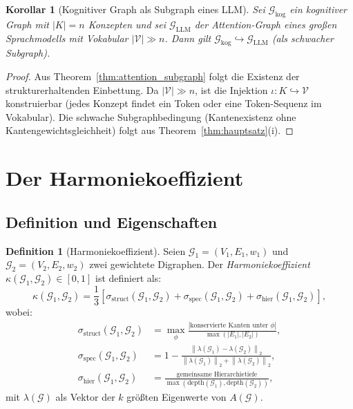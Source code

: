 ﻿\documentclass[12pt,a4paper]{article}
\theoremstyle{plain}
\newtheorem{korollar}[theorem]{Korollar}
\theoremstyle{definition}
\newtheorem{definition}[theorem]{Definition}
\theoremstyle{remark}
\newcommand{\GG}{\mathcal{G}}
\newcommand{\norm}[1]{\left\|#1\right\|}
\begin{document}
\begin{korollar}[Kognitiver Graph als Subgraph eines LLM]
\label{kor:llm_subgraph}
Sei $\GG_{\text{kog}}$ ein kognitiver Graph mit $|K| = n$ Konzepten und sei $\GG_{\text{LLM}}$ der Attention-Graph eines großen Sprachmodells mit Vokabular $|\mathcal{V}| \gg n$. Dann gilt $\GG_{\text{kog}} \hookrightarrow \GG_{\text{LLM}}$ (als schwacher Subgraph).
\end{korollar}

\begin{proof}
Aus Theorem~\ref{thm:attention_subgraph} folgt die Existenz der strukturerhaltenden Einbettung. Da $|\mathcal{V}| \gg n$, ist die Injektion $\iota: K \hookrightarrow \mathcal{V}$ konstruierbar (jedes Konzept findet ein Token oder eine Token-Sequenz im Vokabular). Die schwache Subgraphbedingung (Kantenexistenz ohne Kantengewichtsgleichheit) folgt aus Theorem~\ref{thm:hauptsatz}(i).
\end{proof}

\section{Der Harmoniekoeffizient}
\label{sec:harmonie}

\subsection{Definition und Eigenschaften}

\begin{definition}[Harmoniekoeffizient]
\label{def:harmonie}
Seien $\GG_1 = (V_1, E_1, w_1)$ und $\GG_2 = (V_2, E_2, w_2)$ zwei gewichtete Digraphen. Der \emph{Harmoniekoeffizient} $\kappa(\GG_1, \GG_2) \in [0,1]$ ist definiert als:
\[
  \kappa(\GG_1, \GG_2) = \frac{1}{3}\left[\sigma_{\text{struct}}(\GG_1, \GG_2) + \sigma_{\text{spec}}(\GG_1, \GG_2) + \sigma_{\text{hier}}(\GG_1, \GG_2)\right],
\]
wobei:
\begin{align}
  \sigma_{\text{struct}}(\GG_1, \GG_2) &= \max_{\phi} \frac{|\text{konservierte Kanten unter } \phi|}{\max(|E_1|, |E_2|)}, \\[6pt]
  \sigma_{\text{spec}}(\GG_1, \GG_2) &= 1 - \frac{\norm{\lambda(\GG_1) - \lambda(\GG_2)}_2}{\norm{\lambda(\GG_1)}_2 + \norm{\lambda(\GG_2)}_2}, \\[6pt]
  \sigma_{\text{hier}}(\GG_1, \GG_2) &= \frac{\text{gemeinsame Hierarchietiefe}}{\max(\text{depth}(\GG_1), \text{depth}(\GG_2))},
\end{align}
mit $\lambda(\GG)$ als Vektor der $k$ größten Eigenwerte von $A(\GG)$.
\end{definition}
\end{document}
